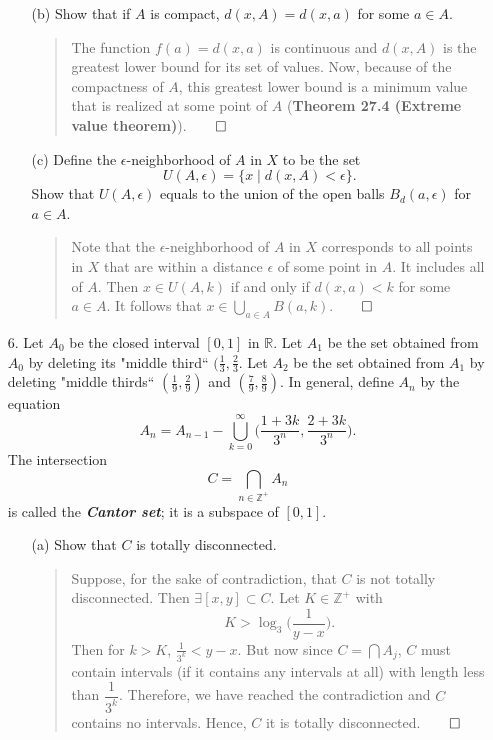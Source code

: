 \documentclass[12pt, a4paper]{article}
\newcommand{\pints}{\mathbb{Z}^+}      %
\newcommand{\reals}{\mathbb{R}}        %
\begin{document}
\begin{itemize}
\begin{itemize}
\item[]

\item[(b)]
Show that if $A$ is compact, $d(x, A) = d(x, a)$ for some $a \in A$.
\begin{quote}
The function $f(a) = d(x, a)$ is continuous and $d(x, A)$ is the greatest lower bound for its set of
values. Now, because of the compactness of $A$, this greatest lower bound is a minimum value that is realized at some
point of $A$ (\textbf{Theorem 27.4 (Extreme value theorem)}).$\qed$
\end{quote}

\item[]

\item[(c)]
Define the $\epsilon$-neighborhood of $A$ in $X$ to be the set
$$U(A, \epsilon) = \{x \mid d(x, A) < \epsilon\}.$$
Show that $U(A, \epsilon)$ equals to the union of the open balls $B_d(a, \epsilon)$ for $a \in A$.
\begin{quote}
Note that the $\epsilon$-neighborhood of $A$ in $X$
corresponds to all points in $X$ that are within a distance
$\epsilon$ of some point in $A$. It includes all of $A$.
Then $x \in U(A, k)$ if and only if $d(x, a) < k$ for some $a \in A$. It follows that $x \in \bigcup_{a \in A}B(a, k)$.$\qed$
\end{quote}
\end{itemize}

\item[]
\item[]

\item[6.]
Let $A_0$ be the closed interval $[0, 1]$ in $\reals$.
Let $A_1$ be the set obtained from $A_0$ by deleting its
"middle third`` $(\frac{1}{3}, \frac{2}{3}$. Let $A_2$
be the set obtained from $A_1$ by deleting "middle thirds``
$(\frac{1}{9}, \frac{2}{9})$ and $(\frac{7}{9}, \frac{8}{9})$.
In general, define $A_n$ by the equation
$$A_n = A_{n - 1} - \displaystyle\bigcup_{k = 0}^{\infty}\Bigg(\dfrac{1 + 3k}{3^n}, \dfrac{2 + 3k}{3^n}\Bigg).$$
The intersection
$$C = \bigcap_{n \in \pints}A_n$$
is called the \textbf{\textit{Cantor set}}; it is a subspace of $[0, 1]$.
\begin{itemize}
\item[(a)]
Show that $C$ is totally disconnected.
\begin{quote}
Suppose, for the sake of contradiction, that $C$
is not totally disconnected. Then $\exists [x, y] \subset C$.
Let $K \in \pints$ with
$$K > \log_3\Bigg(\dfrac{1}{y - x}\Bigg).$$
Then for $k > K$, $\frac{1}{3^k} < y - x$. But now since $C = \bigcap A_j$, $C$ must contain intervals (if it contains any intervals at all) with length less  than $\dfrac{1}{3^k}$. Therefore, we have reached the contradiction and $C$ contains no intervals. Hence, $C$ it is totally disconnected.$\qed$
\end{quote}


\end{itemize}
\end{itemize}
\end{document}
